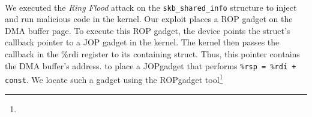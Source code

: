 \DIFdelbegin \paragraph{}
\addtocounter{paragraph}{-1}%
\DIFdelend \DIFaddbegin \smallskip
\noindent\textbf{}
\DIFaddend We executed the \textit{Ring Flood} attack on the \texttt{skb\_shared\_info} structure to inject and run malicious code in the kernel.
Our exploit places a ROP gadget on the DMA buffer page. To execute this ROP gadget, the device points the struct's callback pointer to a JOP gadget in the kernel. The kernel then passes the callback in the \%rdi register to its containing struct. Thus, this pointer contains the DMA buffer's address. 
\DIFdelbegin {}\DIFdelend \DIFaddbegin {}\DIFaddend to place a JOP\DIFaddbegin {}\DIFaddend gadget that performs \texttt{\%rsp = \%rdi + const}. We locate such a gadget using the ROPgadget tool\DIFdelbegin {}\footnote{%
} %
\addtocounter{footnote}{-1}%
\DIFdelend \DIFaddbegin {}

 \DIFaddend
